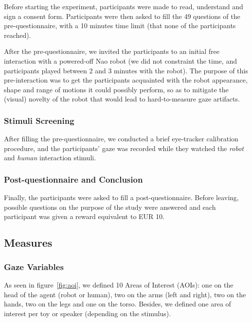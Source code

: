 \documentclass[lettersize, noapacite, twoside, HRI]{apa_HRI}
\begin{document}
Before starting the experiment, participants were made to read, understand and sign a
consent form. Participants were then asked to fill the 49 questions of
the pre-questionnaire, with a 10 minutes time limit (that none of the participants
reached).

After the pre-questionnaire, we invited the participants to an initial
free interaction with a powered-off Nao robot (we did not constraint
the time, and participants played between 2 and 3 minutes with the robot).
The purpose of this pre-interaction was to get the participants acquainted with the
robot appearance, shape and range of motions it could possibly perform, so as to
mitigate the (visual) novelty of the robot that would lead to hard-to-measure gaze artifacts.

\subsubsection{Stimuli Screening}

After filling the pre-questionnaire, we conducted a brief eye-tracker
calibration procedure, and the participants' gaze was recorded while they
watched the \emph{robot} and \emph{human} interaction stimuli.

\subsubsection{Post-questionnaire and Conclusion}

Finally, the participants were asked to fill a post-questionnaire.
Before leaving, possible questions on the purpose of the study were
answered and each participant was given a reward equivalent to EUR 10.

\subsection{Measures}

\subsubsection{Gaze Variables}

As seen in figure~\ref{fig:aoi}, we defined 10 Areas of Interest (AOIs): one on
the head of the agent (robot or human), two on the arms (left and right), two on
the hands, two on the legs and one on the torso. Besides, we defined one area of
interest per toy or speaker (depending on the stimulus).
\end{document}
